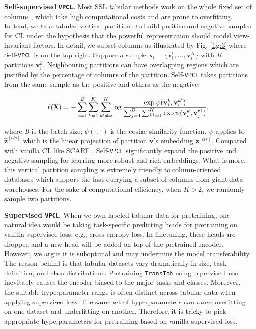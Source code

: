\textbf{Self-supervised \texttt{VPCL}.} Most SSL tabular methods work on the whole fixed set of columns \cite{yoon2020vime,darabi2021contrastive, bahri2022scarf}, which take high computational costs and are prone to overfitting. Instead, we take tabular vertical partitions to build positive and negative samples for CL under the hypothesis that the powerful representation should model view-invariant factors. In detail, we subset columns as illustrated by Fig. \ref{fig:3} where Self-\texttt{VPCL} is on the top right. Suppose a sample $\mathbf{x}_i = \{\mathbf{v}_i^1,\dots,\mathbf{v}_i^K\}$ with $K$ partitions $\mathbf{v}_i^k$. Neighbouring partitions can have overlapping regions which are justified by the percentage of columns of the partition. Self-\texttt{VPCL} takes partitions from the same sample as the positive and others as the negative:

\begin{equation}\label{eq:MSSCL}
    \ell({\rm \mathbf{X}}) = -\sum_{i=1}^B \sum_{k=1}^K \sum_{k^\prime \neq k}^K \log \frac{\exp\psi(\mathbf{v}_i^k, \mathbf{v}_i^{k^\prime})}{\sum_{j=1}^B \sum_{k^\dag=1}^K \exp \psi(\mathbf{v}_i^k, \mathbf{v}_j^{k^\dag})},
\end{equation}

where $B$ is the batch size; $\psi(\cdot,\cdot)$ is the cosine similarity function. $\psi$ applies to $\hat{\mathbf{z}}^{[cls]}$ which is the linear projection of partition $\mathbf{v}$'s embedding $\mathbf{z}^{[cls]}$. Compared with vanilla CL like SCARF \cite{bahri2022scarf}, Self-\texttt{VPCL} significantly expand the positive and negative sampling for learning more robust and rich embeddings. What is more, this vertical partition sampling is extremely friendly to column-oriented databases \cite{stonebraker2018c} which support the fast querying a subset of columns from giant data warehouses. For the sake of computational efficiency, when $K>2$, we randomly sample two partitions.

\textbf{Supervised \texttt{VPCL}.} When we own labeled tabular data for pretraining, one natural idea would be taking task-specific predicting heads for pretraining on vanilla supervised loss, e.g., cross-entropy loss. In finetuning, these heads are dropped and a new head will be added on top of the pretrained encoder. However, we argue it is suboptimal and may undermine the model transferability. The reason behind is that tabular datasets vary dramatically in size, task definition, and class distributions. Pretraining \texttt{TransTab} using supervised loss inevitably causes the encoder biased to the major tasks and classes. Moreover, the suitable hyperparameter range is often distinct across tabular data when applying supervised loss. The same set of hyperparameters can cause overfitting on one dataset and underfitting on another. Therefore, it is tricky to pick appropriate hyperparameters for pretraining based on vanilla supervised loss.

